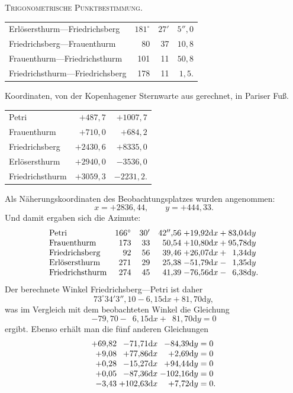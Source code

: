 \clearpage
{}\hfill\textsc{Trigonometrische Punktbestimmung.}\hfill\mbox{}\par\medskip
\begin{center}
\begin{tabular}{lrrr}
Erlösersthurm---Friedrichsberg&$181^\circ$&$27'$&$5''{,}0$\\
Friedrichsberg---Frauenthurm&80&37&$10{,}8$\\
Frauenthurm---Friedrichsthurm&101&11&$50{,}8$\\
Friedrichsthurm---Friedrichsberg&178&11&$1{,}5$.
\end{tabular}
\end{center}
\begin{center}
Koordinaten, von der Kopenhagener Sternwarte aus gerechnet, in Pariser Fuß.
\end{center}
\begin{center}
\begin{tabular}{lrr}
Petri&$+487{,}7$&$+1007{,}7$\\
Frauenthurm&$+710{,}0$&$+684{,}2$\\
Friedrichsberg&$+2430{,}6$&$+8335{,}0$\\
Erlösersthurm&$+2940{,}0$&$-3536{,}0$\\
Friedrichsthurm&$+3059{,}3$&$-2231{,}2$.
\end{tabular}
\end{center}
Als Näherungskoordinaten des Beobachtungsplatzes wurden angenommen:
\[
x=+2836{,}44,\qquad y=+444{,}33.
\]
Und damit ergaben sich die Azimute:
\[
\begin{array}{lrrr@{\;}l}
\text{Petri}&166^\circ&30'&42''{,}56&+19{,}92\mathrm dx+83{,}04\mathrm dy\\
\text{Frauenthurm}&173&33&50{,}54&+10{,}80\mathrm dx+95{,}78\mathrm dy\\
\text{Friedrichsberg}&92&56&39{,}46&+26{,}07\mathrm dx+\phantom01{,}34\mathrm dy\\
\text{Erlösersthurm}&271&29&25{,}38&-51{,}79\mathrm dx-\phantom01{,}35\mathrm dy\\
\text{Friedrichsthurm}&274&45&41{,}39&-76{,}56\mathrm dx-\phantom06{,}38\mathrm dy.
\end{array}
\]
Der berechnete Winkel Friedrichsberg---Petri ist daher
\[
73^\circ34'3''{,}10-6{,}15\mathrm dx+81{,}70\mathrm dy,
\]
was im Vergleich mit dem beobachteten Winkel die Gleichung
\[
-79{,}70-\phantom06{,}15\mathrm dx+\phantom081{,}70\mathrm dy=0
\]
ergibt. Ebenso erhält man die fünf anderen Gleichungen
\[
\begin{array}{r@{\;}r@{\;}r@{\;}l}
+69{,}82&-71{,}71\mathrm dx&-84{,}39\mathrm dy&=0\\
+9{,}08&+77{,}86\mathrm dx&+2{,}69\mathrm dy&=0\\
+0{,}28&-15{,}27\mathrm dx&+94{,}44\mathrm dy&=0\\
+0{,}05&-87{,}36\mathrm dx&-102{,}16\mathrm dy&=0\\
-3{,}43&+102{,}63\mathrm dx&+7{,}72\mathrm dy&=0.
\end{array}
\]
